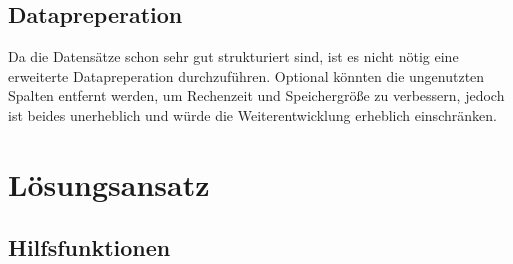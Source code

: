 \documentclass{article}
\begin{document}
\subsection{Datapreperation}
Da die Datensätze schon sehr gut strukturiert sind, ist es nicht nötig eine erweiterte Datapreperation durchzuführen.
Optional könnten die ungenutzten Spalten entfernt werden, um Rechenzeit und Speichergröße zu verbessern, jedoch ist beides unerheblich und würde die Weiterentwicklung erheblich einschränken.

\section{Lösungsansatz}
\subsection{Hilfsfunktionen}
\end{document}
